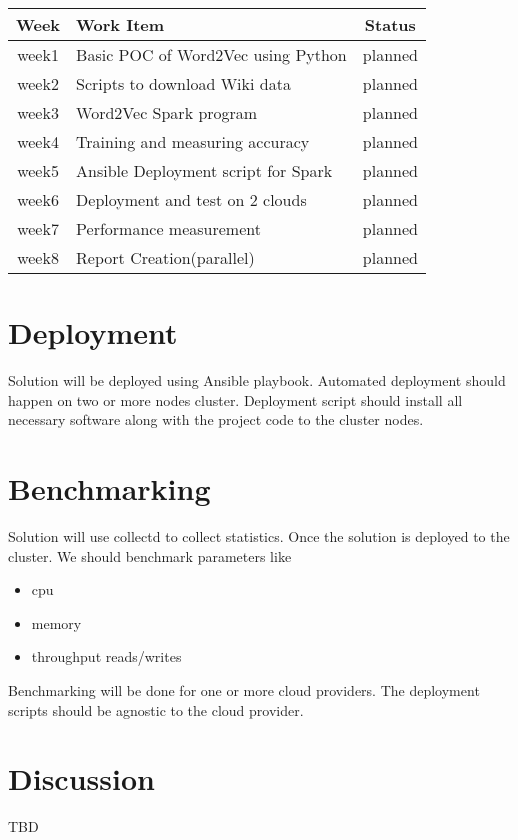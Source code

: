 \documentclass[9pt,twocolumn,twoside]{../../styles/osajnl}
\begin{document}
\begin{center}
\begin{tabular}{ |c|l|c| } 
 \hline
Week & Work Item & Status \\
\hline
week1 & Basic POC of Word2Vec using Python  & planned \\ 
week2 & Scripts to download Wiki data & planned \\ 
week3 & Word2Vec Spark program & planned \\ 
week4 & Training and measuring accuracy & planned \\ 
week5 &  Ansible Deployment script for Spark & planned \\ 
week6 & Deployment and test on 2 clouds & planned \\ 
week7 & Performance measurement  & planned \\ 
week8 & Report Creation(parallel) & planned \\ 
 \hline
\end{tabular}
\end{center}



\section{Deployment}
Solution will be deployed using Ansible \cite{www-ansible} playbook. Automated deployment should happen on two or more nodes cluster. Deployment script should install all necessary software along with the project code to the cluster nodes.

\section{Benchmarking}
Solution will use collectd \cite{www-collectd} to collect statistics. Once the solution is deployed to the cluster. We should benchmark parameters like
\begin{itemize}[noitemsep]
\item cpu
\item memory
\item throughput reads/writes
\end{itemize}
Benchmarking will be done for one or more cloud providers. The deployment scripts should be agnostic to the cloud provider. 

\section{Discussion}
TBD
\end{document}
